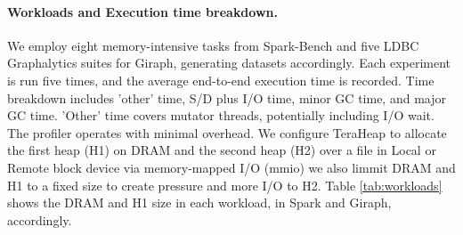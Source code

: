 \paragraph{Workloads and Execution time breakdown.} We employ eight memory-intensive tasks from Spark-Bench and five LDBC Graphalytics suites for Giraph, generating datasets accordingly. Each experiment is run five times, and the average end-to-end execution time is recorded. Time breakdown includes 'other' time, S/D plus I/O time, minor GC time, and major GC time. 'Other' time covers mutator threads, potentially including I/O wait. The profiler operates with minimal overhead. We configure TeraHeap to allocate the first heap (H1) on DRAM and the second heap (H2) over a file in Local or Remote block device via memory-mapped I/O (mmio) we also limmit DRAM and H1 to a fixed size to create pressure and more I/O to H2. Table \ref{tab:workloads} shows the DRAM and H1 size in each workload, in Spark and Giraph, accordingly.
\begin{table}[h]
\centering
{}
\caption{Teraheap workload configuration table.}
\label{tab:workloads}
\end{table}

